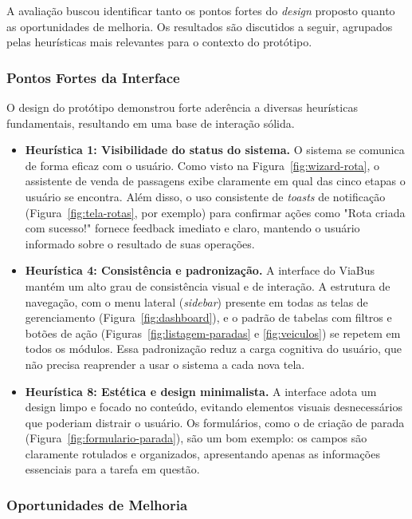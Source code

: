 A avaliação buscou identificar tanto os pontos fortes do \textit{design} proposto quanto as oportunidades de melhoria. Os resultados são discutidos a seguir, agrupados pelas heurísticas mais relevantes para o contexto do protótipo.

\subsubsection{Pontos Fortes da Interface}

O design do protótipo demonstrou forte aderência a diversas heurísticas fundamentais, resultando em uma base de interação sólida.

\begin{itemize}
  \item \textbf{Heurística 1: Visibilidade do status do sistema.} O sistema se comunica de forma eficaz com o usuário. Como visto na Figura~\ref{fig:wizard-rota}, o assistente de venda de passagens exibe claramente em qual das cinco etapas o usuário se encontra. Além disso, o uso consistente de \textit{toasts} de notificação (Figura~\ref{fig:tela-rotas}, por exemplo) para confirmar ações como "Rota criada com sucesso!" fornece feedback imediato e claro, mantendo o usuário informado sobre o resultado de suas operações.

  \item \textbf{Heurística 4: Consistência e padronização.} A interface do ViaBus mantém um alto grau de consistência visual e de interação. A estrutura de navegação, com o menu lateral (\textit{sidebar}) presente em todas as telas de gerenciamento (Figura~\ref{fig:dashboard}), e o padrão de tabelas com filtros e botões de ação (Figuras~\ref{fig:listagem-paradas} e \ref{fig:veiculos}) se repetem em todos os módulos. Essa padronização reduz a carga cognitiva do usuário, que não precisa reaprender a usar o sistema a cada nova tela.

  \item \textbf{Heurística 8: Estética e design minimalista.} A interface adota um design limpo e focado no conteúdo, evitando elementos visuais desnecessários que poderiam distrair o usuário. Os formulários, como o de criação de parada (Figura~\ref{fig:formulario-parada}), são um bom exemplo: os campos são claramente rotulados e organizados, apresentando apenas as informações essenciais para a tarefa em questão.
\end{itemize}

\subsubsection{Oportunidades de Melhoria}

